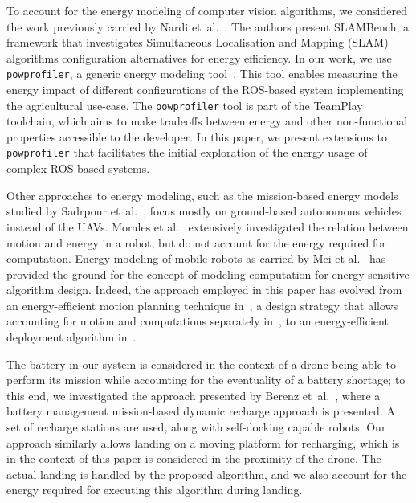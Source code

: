 \documentclass[conference, onecolumn, draftclsnofoot]{IEEEtran}
\newcommand{\stt}[1]{{\small\tt #1}} %
\newcommand{\powprof}{\stt{powprofiler}}
\begin{document}

%
To account for the energy modeling of computer vision algorithms, we
considered the work previously carried by Nardi
et~al.~\cite{nardi2015introducing}. The authors present SLAMBench, a
framework that investigates Simultaneous Localisation and Mapping (SLAM) algorithms configuration alternatives
for energy efficiency. In our work, we use \powprof{}, a generic energy
modeling tool~\cite{seewald2019coarse}. This tool enables measuring
the energy impact of different configurations of the ROS-based system
implementing the agricultural use-case.
The \powprof{} tool is part of the TeamPlay toolchain, which aims to make tradeoffs between energy and other non-functional properties accessible to the developer. 
In this paper, we present
extensions to \powprof{} that facilitates the initial exploration of
the energy usage of complex ROS-based systems.


Other approaches to energy modeling, such as the mission-based energy
models studied by Sadrpour et~al.~\cite{sadrpour2013experimental,
  sadrpour2013mission}, focus mostly on ground-based autonomous
vehicles instead of the UAVs. Morales et al.~\cite{morales2009power}
extensively investigated the relation between motion and energy in a
robot, but do not account for the energy required for computation.
%
Energy modeling of mobile robots as carried by Mei et
al.~\cite{mei2006deployment, mei2005case, mei2004energy} has provided
the ground for the concept of modeling computation for
energy-sensitive algorithm design. Indeed, the approach employed in this paper has evolved
from an energy-efficient motion planning technique
in~\cite{mei2004energy}, a design strategy that allows accounting for
motion and computations separately in~\cite{mei2005case}, to an
energy-efficient deployment algorithm in~\cite{mei2006deployment}.


The battery in our system is considered in the context of a drone
being able to perform its mission while accounting for the eventuality
of a battery shortage; to this end, we investigated the approach
presented by Berenz et~al.~\cite{berenz2012autonomous}, where a
battery management mission-based dynamic recharge approach is
presented. A set of recharge stations are used, along with
self-docking capable robots. Our approach similarly allows landing on
a moving platform for recharging, which is in the context of this
paper is considered in the proximity of the drone. The actual landing
is handled by the proposed algorithm, and we also account for the
energy required for executing this algorithm during landing.
%
\end{document}
